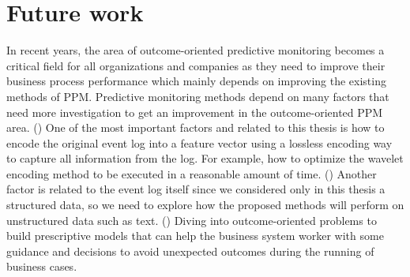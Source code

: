 \section{Future work}
In recent years, the area of outcome-oriented predictive monitoring becomes a critical field for all organizations and companies as they need to improve their business process performance which mainly depends on improving the existing methods of PPM.  Predictive monitoring methods depend on many factors that need more investigation to get an improvement in the outcome-oriented PPM area. () One of the most important factors and related to this thesis is how to encode the original event log into a feature vector using a lossless encoding way to capture all information from the log. For example, how to optimize the wavelet encoding method to be executed in a reasonable amount of time.  () Another factor is related to the event log itself since we considered only in this thesis a structured data, so we need to explore how the proposed methods will perform on unstructured data such as text. () Diving into outcome-oriented problems to build prescriptive models that can help the business system worker with some guidance and decisions to avoid unexpected outcomes during the running of business cases.



